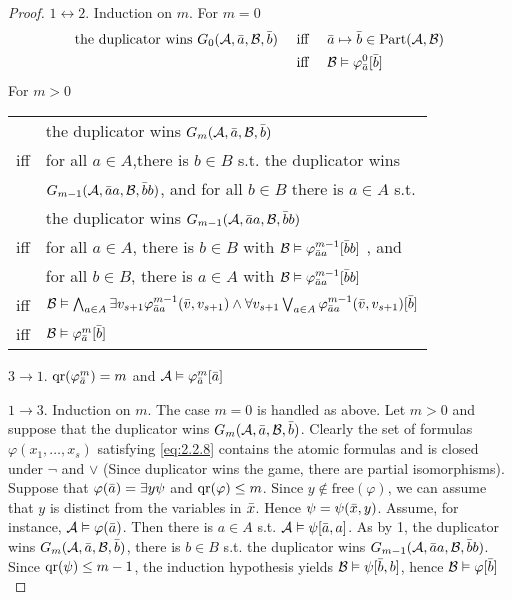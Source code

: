 \documentclass[11pt]{article}
\def \Part {\text{Part}}
\def \free {\text{free}}
\begin{document}
\begin{proof}
\(1\leftrightarrow 2\). Induction on \(m\). For \(m=0\)
\begin{align*}
\text{the duplicator wins }G_0(\cala,\bara,\calb,\barb)
&\quad\text{ iff }\quad
\bara\mapsto\barb\in\Part(\cala,\calb)\\
&\quad\text{ iff }\quad
\calb\vDash\varphi_{\bara}^0[\barb]
\end{align*}
For \(m>0\)
\begin{center}
\begin{tabular}{ll}
 & the duplicator wins \(G_m(\mathcal{A},\bar{a},\mathcal{B},\bar{b})\)\\
iff & for all \(a\in A\),there is \(b\in B\) s.t. the duplicator wins\\
 & \(G_{m-1}(\mathcal{A},\bar{a} a,\mathcal{B},\bar{b} b)\), and for all \(b\in B\) there is \(a\in A\) s.t.\\
 & the duplicator wins \(G_{m-1}(\mathcal{A},\bar{a} a,\mathcal{B},\bar{b} b)\)\\
iff & for all \(a\in A\), there is \(b\in B\) with \(\mathcal{B}\vDash\varphi_{\bar{a} a}^{m-1}[\bar{b} b]\) , and\\
 & for all \(b\in B\), there is \(a\in A\) with \(\mathcal{B}\vDash\varphi_{\bar{a} a}^{m-1}[\bar{b} b]\)\\
iff & \(\mathcal{B}\vDash\bigwedge_{a\in A}\exists v_{s+1}\varphi_{\bar{a} a}^{m-1}(\bar{v},v_{s+1})\wedge\forall v_{s+1}\bigvee_{a\in A}\varphi_{\bar{a} a}^{m-1}(\bar{v},v_{s+1})[\bar{b}]\)\\
iff & \(\mathcal{B}\vDash\varphi_{\bar{a}}^m[\bar{b}]\)\\
\end{tabular}
\end{center}

\(3\to1\). \(\operatorname{qr}(\varphi^m_{\bar{a}})=m\) and \(\mathcal{A}\vDash\varphi_{\bar{a}}^m[\bar{a}]\)

\(1\to 3\). Induction on \(m\). The case \(m=0\) is handled as above. Let \(m>0\) and suppose
that the duplicator wins \(G_m(\mathcal{A},\bar{a},\mathcal{B},\bar{b})\).  Clearly the set of formulas
\(\varphi(x_1,\dots,x_s)\) satisfying 
\ref{eq:2.2.8} contains the atomic formulas and is closed under \(\neg\) and \(\vee\) (Since
duplicator wins the game, there are partial isomorphisms). Suppose that
\(\varphi(\bar{a})=\exists y\psi\) and \(\operatorname{qr}(\varphi)\le m\). Since \(y\not\in\free(\varphi)\), we can assume
that \(y\) is distinct from the variables in \(\bar{x}\). Hence \(\psi=\psi(\bar{x},y)\). Assume, for
instance, \(\mathcal{A}\vDash\varphi(\bar{a})\). Then there is \(a\in A\) s.t.
\(\mathcal{A}\vDash\psi[\bar{a},a]\). As by 1, the duplicator wins \(G_m(\mathcal{A},\bar{a},\mathcal{B},\bar{b})\),
there is \(b\in B\) s.t. the duplicator wins \(G_{m-1}(\mathcal{A},\bar{a} a,\mathcal{B},\bar{b} b)\).
Since \(\operatorname{qr}(\psi)\le m-1\), the induction hypothesis yields
\(\mathcal{B}\vDash\psi[\bar{b},b]\), hence \(\mathcal{B}\vDash\varphi[\bar{b}]\)
\end{proof}
\end{document}
